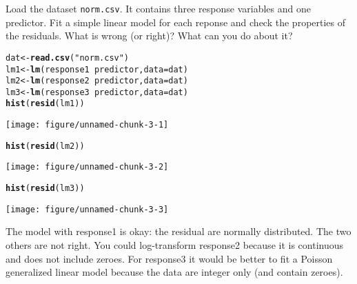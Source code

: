 \documentclass[12pt,a4paper]{scrartcl}\usepackage[]{graphicx}\usepackage[]{color}
\makeatletter
\def\maxwidth{ %
  \ifdim\Gin@nat@width>\linewidth
    \linewidth
  \else
    \Gin@nat@width
  \fi
}
\newcommand{\hlstr}[1]{\textcolor[rgb]{0.192,0.494,0.8}{#1}}%
\newcommand{\hlopt}[1]{\textcolor[rgb]{0,0,0}{#1}}%
\newcommand{\hlstd}[1]{\textcolor[rgb]{0.345,0.345,0.345}{#1}}%
\newcommand{\hlkwb}[1]{\textcolor[rgb]{0.69,0.353,0.396}{#1}}%
\newcommand{\hlkwc}[1]{\textcolor[rgb]{0.333,0.667,0.333}{#1}}%
\newcommand{\hlkwd}[1]{\textcolor[rgb]{0.737,0.353,0.396}{\textbf{#1}}}%
\newenvironment{kframe}{%
 \def\at@end@of@kframe{}%
 \ifinner\ifhmode%
  \def\at@end@of@kframe{\end{minipage}}%
  \begin{minipage}{\columnwidth}%
 \fi\fi%
 \def\FrameCommand##1{\hskip\@totalleftmargin \hskip-\fboxsep
 \colorbox{shadecolor}{##1}\hskip-\fboxsep
     \hskip-\linewidth \hskip-\@totalleftmargin \hskip\columnwidth}%
 \MakeFramed {\advance\hsize-\width
   \@totalleftmargin\z@ \linewidth\hsize
   \@setminipage}}%
 {\par\unskip\endMakeFramed%
 \at@end@of@kframe}
\newenvironment{knitrout}{}{} %
\makeatother
\begin{document}
\begin{Exercise}[difficulty=1, title={Is that normality normal?}]


Load the dataset \texttt{norm.csv}. It contains three response variables and one predictor. Fit a simple linear model for each reponse and check the properties of the residuals. What is wrong (or right)? What can you do about it?
\end{Exercise}
\begin{Answer}
\begin{knitrout}
\color{fgcolor}\begin{kframe}
\begin{alltt}
\hlstd{dat} \hlkwb{<-} \hlkwd{read.csv}\hlstd{(}\hlstr{"norm.csv"}\hlstd{)}
\hlstd{lm1} \hlkwb{<-} \hlkwd{lm}\hlstd{(response1}\hlopt{~}\hlstd{predictor,} \hlkwc{data}\hlstd{=dat)}
\hlstd{lm2} \hlkwb{<-} \hlkwd{lm}\hlstd{(response2}\hlopt{~}\hlstd{predictor,} \hlkwc{data}\hlstd{=dat)}
\hlstd{lm3} \hlkwb{<-} \hlkwd{lm}\hlstd{(response3}\hlopt{~}\hlstd{predictor,} \hlkwc{data}\hlstd{=dat)}
\hlkwd{hist}\hlstd{(}\hlkwd{resid}\hlstd{(lm1))}
\end{alltt}
\end{kframe}
\texttt{[image: figure/unnamed-chunk-3-1]} 
\begin{kframe}\begin{alltt}
\hlkwd{hist}\hlstd{(}\hlkwd{resid}\hlstd{(lm2))}
\end{alltt}
\end{kframe}
\texttt{[image: figure/unnamed-chunk-3-2]} 
\begin{kframe}\begin{alltt}
\hlkwd{hist}\hlstd{(}\hlkwd{resid}\hlstd{(lm3))}
\end{alltt}
\end{kframe}
\texttt{[image: figure/unnamed-chunk-3-3]} 

\end{knitrout}

The model with response1 is okay: the residual are normally distributed. The two others are not right. You could log-transform response2 because it is continuous and does not include zeroes. For response3 it would be better to fit a Poisson generalized linear model because the data are integer only (and contain zeroes).
\end{Answer}
\end{document}
